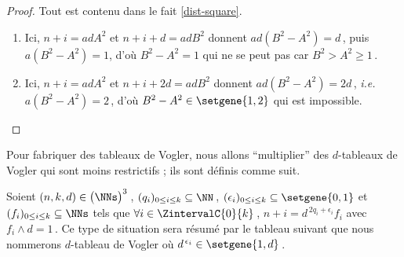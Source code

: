 \begin{proof}
	Tout est contenu dans le fait \ref{dist-square}.
	
	\begin{enumerate}

		\item Ici, $n + i = ad A^2$ et $n + i + d = ad B^2$ donnent $ad (B^2 - A^2) = d$\,, puis $a (B^2 - A^2) = 1$, d'où $B^2 - A^2 = 1$ qui ne se peut pas car $B^2 > A^2 \geq 1$\,.

		\item Ici, $n + i = ad A^2$ et $n + i + 2 d = ad B^2$ donnent $ad (B^2 - A^2) = 2d$\,, \emph{i.e.} $a (B^2 - A^2) = 2$\,, d'où $B^2 - A^2 \in \setgene{1, 2}$ qui est impossible.
	\end{enumerate}
\end{proof}




Pour fabriquer des tableaux de Vogler, nous allons \enquote{multiplier} des $d$-tableaux de Vogler qui sont moins restrictifs ; ils sont définis comme suit.
	

\begin{defi}
	Soient $(n, k, d) \in \big( \NNs \big)^3$\,,
	$( q_i )_{0 \leq i \leq k} \subseteq \NN$\,,
	$( \epsilon_i )_{0 \leq i \leq k} \subseteq \setgene{0, 1}$
	et
	$( f_i )_{0 \leq i \leq k} \subseteq \NNs$
	tels que 
	$\forall i \in \ZintervalC{0}{k}$\,, $n + i = d^{\,2q_i + \epsilon_i} f_i$ avec $f_i \wedge d = 1$\,.
	Ce type de situation sera résumé par le tableau suivant que nous nommerons $d$-tableau de Vogler où $d^{\,\epsilon_i} \in \setgene{1, d}$\,.

	\begin{center}
	\end{center}
\end{defi}


